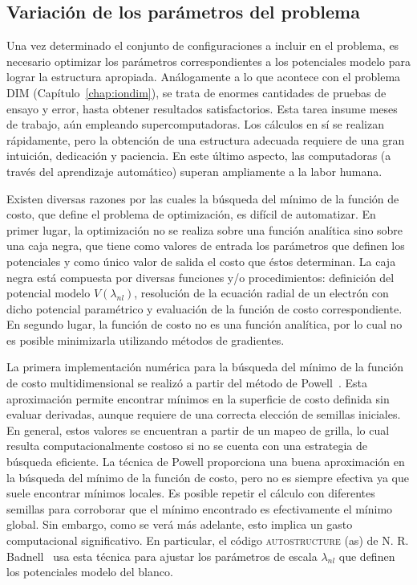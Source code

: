 \subsection{Variación de los parámetros del problema}
\label{sec:powell}

Una vez determinado el conjunto de configuraciones a incluir en el 
problema, es necesario optimizar los parámetros correspondientes a los 
potenciales modelo para lograr la estructura apropiada. Análogamente a 
lo que acontece con el problema DIM (Capítulo~\ref{chap:iondim}), se 
trata de enormes cantidades de pruebas de ensayo y error, hasta obtener 
resultados satisfactorios. Esta tarea insume meses de trabajo, aún 
empleando supercomputadoras. Los cálculos en sí se realizan rápidamente, 
pero la obtención de una estructura adecuada requiere de una gran 
intuición, dedicación y paciencia. En este último aspecto, las 
computadoras (a través del aprendizaje automático) superan ampliamente a 
la labor humana.

Existen diversas razones por las cuales la búsqueda del mínimo de la 
función de costo, que define el problema de optimización, es difícil de 
automatizar. En primer lugar, la optimización no se realiza sobre una 
función analítica sino sobre una caja negra, que tiene como valores de 
entrada los parámetros que definen los potenciales y como único valor de 
salida el costo que éstos determinan. La caja negra está compuesta por 
diversas funciones y/o procedimientos: definición del potencial modelo 
$V(\lambda_{nl})$, resolución de la ecuación radial de un electrón con 
dicho potencial paramétrico y evaluación de la función de costo 
correspondiente. En segundo lugar, la función de costo no es una función 
analítica, por lo cual no es posible minimizarla utilizando métodos de 
gradientes. 

La primera implementación numérica para la búsqueda del mínimo de la 
función de costo multidimensional se realizó a partir del método de 
Powell~\cite{Powell:64,NumRec:07}. Esta aproximación permite encontrar 
mínimos en la superficie de costo definida sin evaluar derivadas, aunque
requiere de una correcta elección de semillas iniciales. 
En general, estos valores se encuentran a partir de un mapeo de grilla, 
lo cual resulta computacionalmente costoso si no se cuenta con una 
estrategia de búsqueda eficiente. La técnica de Powell proporciona una 
buena aproximación en la búsqueda del mínimo de la función de costo, 
pero no es siempre efectiva ya que suele encontrar mínimos locales. Es 
posible repetir el cálculo con diferentes semillas para corroborar que 
el mínimo encontrado es efectivamente el mínimo global. Sin embargo, 
como se verá más adelante, esto implica un gasto computacional 
significativo. En particular, el código \textsc{autostructure} (\acs{as}) 
de N. R. Badnell~\cite{Badnell:11} usa esta técnica para ajustar los 
parámetros de escala $\lambda_{nl}$ que definen los potenciales modelo 
del blanco. 

